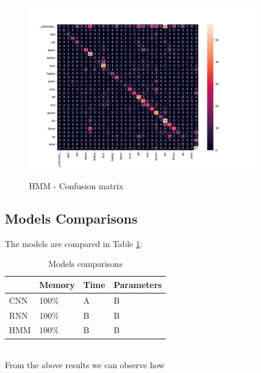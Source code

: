 \begin{figure}[h]
			\centering
	    	\includegraphics[width=10cm, height=8cm]{conf_matrix_cnn_dii_cm}
	    	\caption{HMM - Confusion matrix}
	    	\label{fig:conf_matrix_cnn}
\end{figure} 


\subsection*{\textbf{Models Comparisons}}
The models are compared in Table \ref{table:comparisons}:\\
\begin{table}[h!]
\centering
\begin{tabular}{ p{1.5cm}|p{1.5cm}|p{1.5cm}|p{1.5cm} }
 \hline
  & Memory & Time & Parameters \\
\hline\hline
CNN & 100\% & A & B \\
\hline
RNN & 100\% & B  & B\\
\hline
HMM &100\% & B  & B\\
\hline
\end{tabular}
\caption{Models comparisons}
\label{table:comparisons}
\end{table}\\
\noindent From the above results we can observe how {}